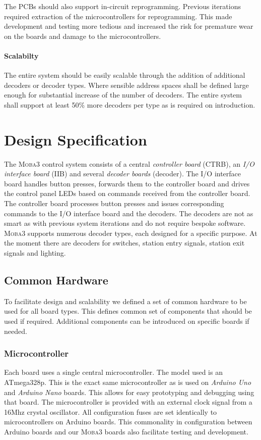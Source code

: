 \documentclass{scrreprt}
\begin{document}
The PCBs should also support in-circuit reprogramming.
Previous iterations required extraction of the microcontrollers for reprogramming.
This made development and testing more tedious and increased the risk for premature wear on the boards and damage to the microcontrollers.

\subsubsection{Scalabilty}
The entire system should be easily scalable through the addition of additional decoders or decoder types.
Where sensible address spaces shall be defined large enough for substantial increase of the number of decoders.
The entire system shall support at least 50\% more decoders per type as is required on introduction.

\chapter{Design Specification}
The \textsc{Moba3} control system consists of a central \emph{controller board} (CTRB), an \emph{I/O interface board} (IIB) and several \emph{decoder boards} (decoder).
The I/O interface board handles button presses, forwards them to the controller board and drives the control panel LEDs based on commands received from the controller board.
The controller board processes button presses and issues corresponding commands to the I/O interface board and the decoders.
The decoders are not as smart as with previous system iterations and do not require bespoke software.
\textsc{Moba3} supports numerous decoder types, each designed for a specific purpose.
At the moment there are decoders for switches, station entry signals, station exit signals and lighting.

\section{Common Hardware}
To facilitate design and scalability we defined a set of common hardware to be used for all board types.
This defines common set of components that should be used if required.
Additional components can be introduced on specific boards if needed.

\subsection{Microcontroller}
Each board uses a single central microcontroller.
The model used is an ATmega328p.
This is the exact same microcontroller as is used on \emph{Arduino Uno} and \emph{Arduino Nano} boards.
This allows for easy prototyping and debugging using that board.
The microcontroller is provided with an external clock signal from a 16Mhz crystal oscillator.
All configuration fuses are set identically to microcontrollers on Arduino boards.
This commonality in configuration between Arduino boards and our \textsc{Moba3} boards also facilitate testing and development.
\end{document}

